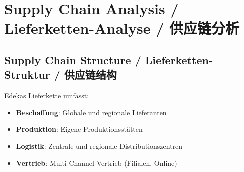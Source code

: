 \chapter{Supply Chain Analysis / Lieferketten-Analyse / 供应链分析}

\section{Supply Chain Structure / Lieferketten-Struktur / 供应链结构}

\begin{otherlanguage}{ngerman}
Edekas Lieferkette umfasst:
\begin{itemize}
    \item \textbf{Beschaffung}: Globale und regionale Lieferanten
    \item \textbf{Produktion}: Eigene Produktionsstätten
    \item \textbf{Logistik}: Zentrale und regionale Distributionszentren
    \item \textbf{Vertrieb}: Multi-Channel-Vertrieb (Filialen, Online)
\end{itemize}
\end{otherlanguage}

